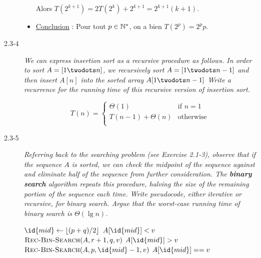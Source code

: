 \begin{description}
\begin{ex}
\begin{itemize}
          Alors $T(2^{k+1}) = 2T(2^k)+2^{k+1} = 2^{k+1}(k+1)$.
        \item \ul{Conclusion} : Pour tout $p \in \mathbb{N}^*$, on a bien $T(2^p) = 2^p p$.
      \end{itemize}
    \end{ex}

  \item[2.3-4] {\itshape We can express insertion sort as a recursive procedure as follows. In order to sort ${ A = [1 \twodots n]}$, we recursively sort $A = [1 \twodots n-1]$ and then insert $A[n]$ into the sorted array ${A[1 \twodots n-1]}$ Write a recurrence for the running time of this recursive version of
insertion sort.}

\begin{ex}
  $$T(n) = \left\{
    \begin{array}{ll}
    \Theta(1) & \text {if } n = 1\\
      T(n-1) + \Theta(n) & \text{otherwise}\\ 
    \end{array}
  \right.$$
\end{ex}

\item[2.3-5] {\itshape Referring back to the searching problem (see Exercise 2.1-3), observe that if the sequence $A$ is sorted, we can check the midpoint of the sequence against and eliminate half of the sequence from further consideration. The {\bfseries binary search} algorithm repeats this procedure, halving the size of the remaining portion of the sequence each time. Write pseudocode, either iterative or recursive, for binary
  search. Argue that the worst-case running time of binary search is $\Theta (\lg n)$.}
  \begin{ex}
    \begin{codebox}
      \li $\id{mid} \gets \lfloor(p+q)/2\rfloor$
      \li \If $A[\id{mid}] < v$ \Then
      \li $\textsc{Rec-Bin-Search}(A, r+1, q, v)$ \End
      \li \Else \If $A[\id{mid}] > v$ \Then
      \li  $\textsc{Rec-Bin-Search}(A, p, \id{mid}-1, v)$ \End
      \li \Else \If $A[\id{mid}]  == v$ \Then
      \li \Return {}
      \li \Else 
      \li \Return {}
    \end{codebox}


\end{ex}
\end{description}
